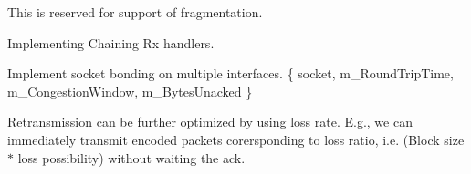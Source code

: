 
\begin{DoxyRefList}
\item[\label{todo__todo000001}%
\hypertarget{todo__todo000001}{}%
Member \hyperlink{struct_network_coding_1_1_header_1_1_data_a21e3e58d1a143834d9c4490613d3c3ff}{Network\+Coding\+:\+:Header\+:\+:Data\+:\+:m\+\_\+\+Last\+Indicator} ]This is reserved for support of fragmentation.  
\item[\label{todo__todo000005}%
\hypertarget{todo__todo000005}{}%
Member \hyperlink{class_network_coding_1_1_transmission_ab363fc5b8d61a9fee2ab0331c1d1938e}{Network\+Coding\+:\+:Transmission\+:\+:Rx\+Handler} (uint8\+\_\+t $\ast$const buffer, const uint16\+\_\+t size, const sockaddr $\ast$const sender\+\_\+addr, const uint32\+\_\+t sender\+\_\+addr\+\_\+len)]Implementing Chaining Rx handlers.  
\item[\label{todo__todo000004}%
\hypertarget{todo__todo000004}{}%
Class \hyperlink{class_network_coding_1_1_transmission_session}{Network\+Coding\+:\+:Transmission\+Session} ]Implement socket bonding on multiple interfaces. \{ socket, m\+\_\+\+Round\+Trip\+Time, m\+\_\+\+Congestion\+Window, m\+\_\+\+Bytes\+Unacked \}  
\item[\label{todo__todo000003}%
\hypertarget{todo__todo000003}{}%
Member \hyperlink{class_network_coding_1_1_transmission_session_a31f038cb688e2e95e40f63821baf34a8}{Network\+Coding\+:\+:Transmission\+Session\+:\+:Process\+Data\+Ack} (const uint8\+\_\+t Rank, const uint8\+\_\+t Max\+Rank, const uint8\+\_\+t Loss, const uint16\+\_\+t Sequence)]Retransmission can be further optimized by using loss rate. E.\+g., we can immediately transmit encoded packets corersponding to loss ratio, i.\+e. (Block size $\ast$ loss possibility) without waiting the ack. 
\end{DoxyRefList}